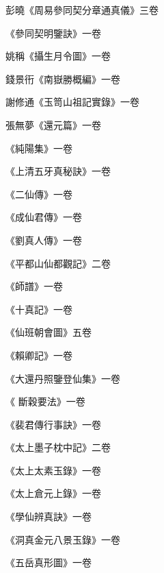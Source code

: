 \begin{pinyinscope}
 彭曉《周易參同契分章通真儀》三卷



 《參同契明鑒訣》一卷



 姚稱《攝生月令圖》一卷



 錢景衎《南嶽勝概編》一卷



 謝修通《玉笥山祖記實錄》一卷



 張無夢《還元篇》一卷



 《純陽集》一卷



 《上清五牙真秘訣》一卷



 《二仙傳》一卷



 《成仙君傳》一卷



 《劉真人傳》一卷



 《平都山仙都觀記》二卷



 《師譜》一卷



 《十真記》一卷



 《仙班朝會圖》五卷



 《賴卿記》一卷



 《大還丹照鑒登仙集》一卷



 《
 斷穀要法》一卷



 《裴君傳行事訣》一卷



 《太上墨子枕中記》二卷



 《太上太素玉錄》一卷



 《太上倉元上錄》一卷



 《學仙辨真訣》一卷



 《洞真金元八景玉錄》一卷



 《五岳真形圖》一卷




\end{pinyinscope}

